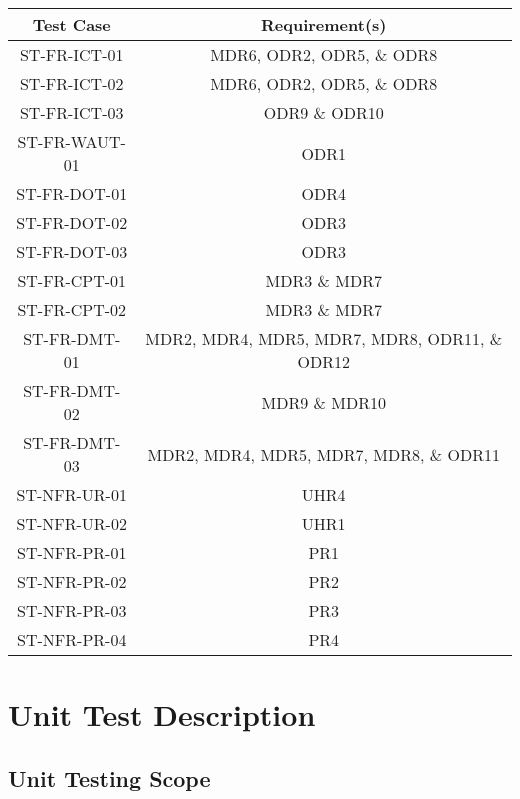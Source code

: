\documentclass[12pt, titlepage]{article}
\begin{document}
\begin{center}
\begin{tabular}{||c c||} 
 \hline
 Test Case & Requirement(s)  \\ [0.5ex] 
 \hline\hline
 ST-FR-ICT-01 & MDR6, ODR2, ODR5, \& ODR8 \\ 
 \hline
 ST-FR-ICT-02 & MDR6, ODR2, ODR5, \& ODR8 \\ 
 \hline
 ST-FR-ICT-03 & ODR9 \& ODR10 \\ 
 \hline
 ST-FR-WAUT-01 & ODR1\\ 
 \hline
 ST-FR-DOT-01 & ODR4 \\ 
 \hline
 ST-FR-DOT-02 & ODR3 \\ 
 \hline
 ST-FR-DOT-03 & ODR3 \\ 
 \hline
 ST-FR-CPT-01 & MDR3 \& MDR7 \\ 
 \hline 
 ST-FR-CPT-02 & MDR3 \& MDR7 \\ 
 \hline
 ST-FR-DMT-01 & MDR2, MDR4, MDR5, MDR7, MDR8, ODR11, \& ODR12 \\ 
 \hline
 ST-FR-DMT-02 & MDR9 \& MDR10 \\ 
 \hline
 ST-FR-DMT-03 & MDR2, MDR4, MDR5, MDR7, MDR8, \& ODR11 \\ 
 \hline
 ST-NFR-UR-01 & UHR4  \\ 
 \hline
 ST-NFR-UR-02 & UHR1 \\
 \hline
 ST-NFR-PR-01 & PR1  \\
 \hline
 ST-NFR-PR-02 & PR2 \\
 \hline
 ST-NFR-PR-03 & PR3 \\ [1ex] 
 \hline
 ST-NFR-PR-04 & PR4 \\ [1ex] 
 \hline
\end{tabular}
\end{center}
  
\newpage
\section{Unit Test Description}

\subsection{Unit Testing Scope}
\end{document}
